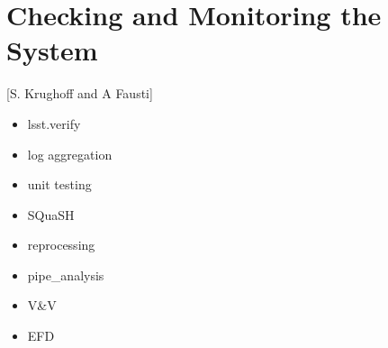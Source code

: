 \section{Checking and Monitoring the System} [S. Krughoff and A Fausti]
\begin{itemize}
\item lsst.verify
\item log aggregation
\item unit testing
\item SQuaSH
\item reprocessing
\item pipe\_analysis
\item V\&V
\item EFD
\end{itemize}
